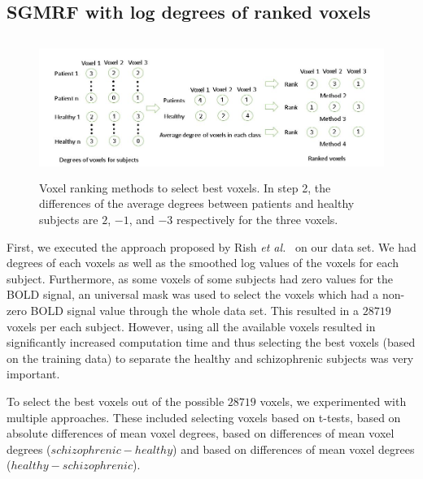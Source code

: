 \documentclass{article} %
\begin{document}
\subsection{SGMRF with log degrees of ranked voxels}
\begin{figure}
\includegraphics[width=\textwidth, height=4.5cm]{diagrams/Voxel_ranking.jpg}
\caption{Voxel ranking methods to select best voxels. In step 2, the differences of the average degrees between patients and healthy subjects are $2$, $-1$, and $-3$ respectively for the three voxels.}
\label{fig:voxel_rank_img}
\end{figure}
First, we executed the approach proposed by Rish \emph{et al.}~\cite{Rish_2013} 
on our data set. We had degrees of each voxels as well 
as the smoothed log values of the voxels for each subject. Furthermore, as 
some voxels of some subjects had zero values for the BOLD signal, an universal 
mask was used to select the voxels which had a non-zero BOLD signal value 
through the whole data set. This resulted in a $28719$ voxels per each subject. 
However, using all the available voxels resulted in significantly increased 
computation time
and thus selecting the best voxels (based on the training data) to separate 
the healthy and schizophrenic subjects was very important. 

To select the best voxels out of the possible $28719$ voxels, we experimented
with multiple approaches. These included selecting voxels based on t-tests, 
based on absolute differences of mean voxel degrees,
based on differences of mean voxel degrees ($schizophrenic - healthy$) and
based on differences of mean voxel degrees ($healthy - schizophrenic$).
\end{document}
